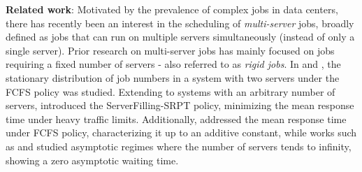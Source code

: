 \documentclass[a4paper]{article}
\theoremstyle{plain}
\theoremstyle{definition}
\theoremstyle{case}
\theoremstyle{remark}
\begin{document}
{\bf Related work}: Motivated by the prevalence of complex jobs in data centers, there has recently been an interest in the scheduling of {\em multi-server} jobs, broadly defined as jobs that can run on multiple servers simultaneously (instead of only a single server).
Prior research on multi-server jobs has mainly focused on jobs requiring a fixed number of servers - also referred to as {\em rigid jobs}. In \cite{Brill_multiserver_1984} and \cite{FILIPPOPOULOs_multiserver_2007}, the stationary distribution of job numbers in a system with %
two servers under the FCFS policy was studied. Extending to systems with an arbitrary number of servers, \cite{multiserver_asymptotic_opimality_2022} introduced the ServerFilling-SRPT policy, %
minimizing the mean response time under heavy traffic limits. %
Additionally, \cite{GROSOF_Reset} addressed the mean response time under FCFS policy, characterizing it up to an additive constant, while works such as \cite{Zero_wait_central-2021} and \cite{sharp_zer_central_2022} studied asymptotic regimes where the number of servers tends to infinity, showing a zero asymptotic waiting time.
\end{document}
